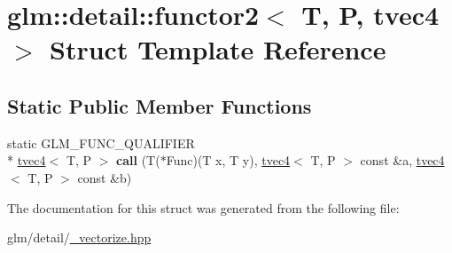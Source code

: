 \hypertarget{structglm_1_1detail_1_1functor2_3_01T_00_01P_00_01tvec4_01_4}{\section{glm\-:\-:detail\-:\-:functor2$<$ T, P, tvec4 $>$ Struct Template Reference}
\label{structglm_1_1detail_1_1functor2_3_01T_00_01P_00_01tvec4_01_4}
}
\subsection*{Static Public Member Functions}
\begin{DoxyCompactItemize}
\item 
\hypertarget{structglm_1_1detail_1_1functor2_3_01T_00_01P_00_01tvec4_01_4_a27fb8a00559c0caa02b7e5892301922f}{static G\-L\-M\-\_\-\-F\-U\-N\-C\-\_\-\-Q\-U\-A\-L\-I\-F\-I\-E\-R \\*
\hyperlink{structglm_1_1tvec4}{tvec4}$<$ T, P $>$ {\bfseries call} (T($\ast$Func)(T x, T y), \hyperlink{structglm_1_1tvec4}{tvec4}$<$ T, P $>$ const \&a, \hyperlink{structglm_1_1tvec4}{tvec4}$<$ T, P $>$ const \&b)}\label{structglm_1_1detail_1_1functor2_3_01T_00_01P_00_01tvec4_01_4_a27fb8a00559c0caa02b7e5892301922f}

\end{DoxyCompactItemize}


The documentation for this struct was generated from the following file\-:\begin{DoxyCompactItemize}
\item 
glm/detail/\hyperlink{__vectorize_8hpp}{\-\_\-vectorize.\-hpp}\end{DoxyCompactItemize}
